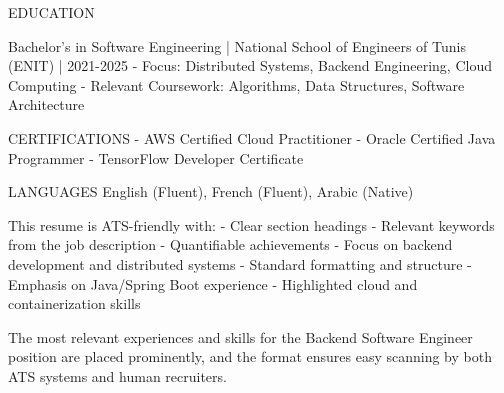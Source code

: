 EDUCATION

Bachelor's in Software Engineering | National School of Engineers of Tunis (ENIT) | 2021-2025
- Focus: Distributed Systems, Backend Engineering, Cloud Computing
- Relevant Coursework: Algorithms, Data Structures, Software Architecture

CERTIFICATIONS
- AWS Certified Cloud Practitioner
- Oracle Certified Java Programmer
- TensorFlow Developer Certificate

LANGUAGES
English (Fluent), French (Fluent), Arabic (Native)

This resume is ATS-friendly with:
- Clear section headings
- Relevant keywords from the job description
- Quantifiable achievements
- Focus on backend development and distributed systems
- Standard formatting and structure
- Emphasis on Java/Spring Boot experience
- Highlighted cloud and containerization skills

The most relevant experiences and skills for the Backend Software Engineer position are placed prominently, and the format ensures easy scanning by both ATS systems and human recruiters.